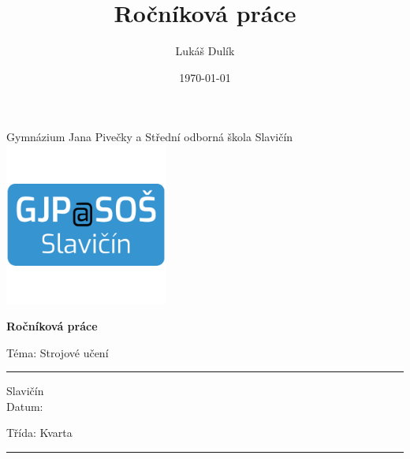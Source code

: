 \documentclass[a4paper,12pt, oneside]{book}
\title{Ročníková práce}
\author{Lukáš Dulík}
\date{\today} %
\begin{document}

\begin{titlepage}
    \begin{center}
        \vspace*{1cm}

        \Huge
		Gymnázium Jana Pivečky a Střední odborná škola Slavičín \\

		\includegraphics[width=0.4\textwidth]{img/gjp.png}

        \textbf{Ročníková práce}

        \vspace{0.5cm}
        \LARGE
        Téma: Strojové učení
    \end{center}

	\vspace{1.5cm}

	\vfill

	\vspace{0.8cm}

	\vspace{5pt}
	\hrule
	\vspace{6pt}

	\Large

	\makeatletter
	\begin{multicols}{2}
		\noindent
		Slavičín \\
		Datum: \@date

	\columnbreak
		\noindent
		\null\hfill Třída: Kvarta \\
		\null\hfill \@author
	\end{multicols}

	\makeatother

	\vspace{5pt}

	\hrule

\end{titlepage}
\end{document}
